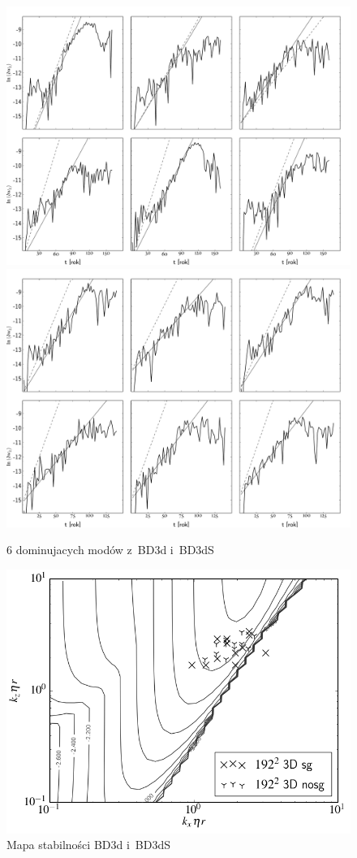 \begin{figure}
   \centering
   \includegraphics[width=0.95\linewidth]{figures/nosg_vlzd_growth}
   \includegraphics[width=0.95\linewidth]{figures/sg_vlzd_growth}
   \caption{6 dominujacych modów z~BD3d i~BD3dS}
   \label{fig:modes3d}
\end{figure}
%   
\begin{figure}
   \centering
   \includegraphics[width=0.5\linewidth]{figures/3d_map_x3_50.png}
   \caption{Mapa stabilności BD3d i~BD3dS}
   \label{fig:map3d}
\end{figure}
